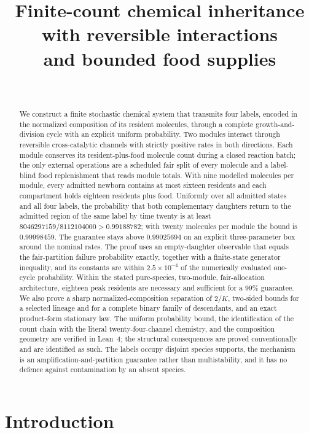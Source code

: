 \documentclass[11pt,a4paper]{article}
\title{Finite-count chemical inheritance with reversible interactions\\ and bounded food supplies}
\author{\PaperAuthor\\[2pt] {\small\itshape \PaperAffiliation}}
\date{\PaperDate}
\theoremstyle{plain}
\theoremstyle{definition}
\theoremstyle{remark}
\begin{document}
\maketitle

\begin{abstract}
We construct a finite stochastic chemical system that transmits four labels, encoded in the normalized composition of its resident molecules, through a complete growth-and-division cycle with an explicit uniform probability. Two modules interact through reversible cross-catalytic channels with strictly positive rates in both directions. Each module conserves its resident-plus-food molecule count during a closed reaction batch; the only external operations are a scheduled fair split of every molecule and a label-blind food replenishment that reads module totals. With nine modelled molecules per module, every admitted newborn contains at most sixteen residents and each compartment holds eighteen residents plus food. Uniformly over all admitted states and all four labels, the probability that both complementary daughters return to the admitted region of the same label by time twenty is at least $8046297159/8112104000>0.99188782$; with twenty molecules per module the bound is $0.99998459$. The guarantee stays above $0.99025694$ on an explicit three-parameter box around the nominal rates. The proof uses an empty-daughter observable that equals the fair-partition failure probability exactly, together with a finite-state generator inequality, and its constants are within $2.5\times10^{-4}$ of the numerically evaluated one-cycle probability. Within the stated pure-species, two-module, fair-allocation architecture, eighteen peak residents are necessary and sufficient for a $99\%$ guarantee. We also prove a sharp normalized-composition separation of $2/K$, two-sided bounds for a selected lineage and for a complete binary family of descendants, and an exact product-form stationary law. The uniform probability bound, the identification of the count chain with the literal twenty-four-channel chemistry, and the composition geometry are verified in Lean~4; the structural consequences are proved conventionally and are identified as such. The labels occupy disjoint species supports, the mechanism is an amplification-and-partition guarantee rather than multistability, and it has no defence against contamination by an absent species.
\end{abstract}

\section{Introduction}\label{sec:intro}
\end{document}
